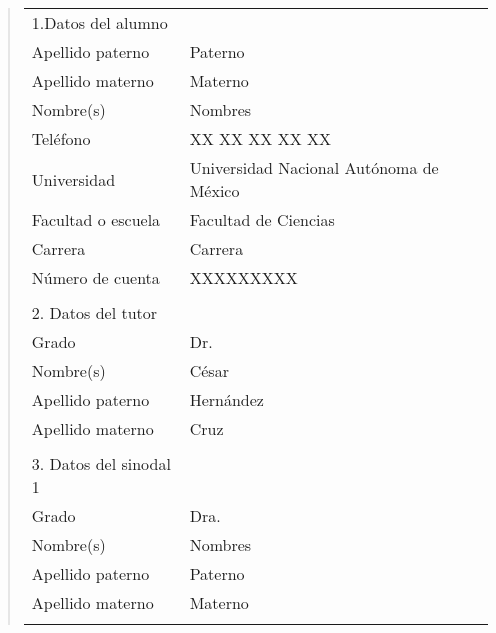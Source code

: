 \begin{quote}
\begin{tabular}{lll}
1.Datos del alumno          & {}                                          \\
Apellido paterno            & Paterno                                     \\
Apellido materno            & Materno                                     \\
Nombre(s)                   & Nombres                                     \\
Tel\'efono                  & XX XX XX XX XX                              \\
Universidad                 & Universidad Nacional Aut\'onoma de M\'exico \\
Facultad o escuela          & Facultad de Ciencias                        \\
Carrera                     & Carrera                                     \\
N\'umero de cuenta          & XXXXXXXXX                                   \\
{}                          & {}                                          \\
2. Datos del tutor          & {}                                          \\
Grado                       & Dr.                                         \\
Nombre(s)                   & C\'esar                                     \\
Apellido paterno            & Hern\'andez                                 \\
Apellido materno            & Cruz                                        \\
{}                          & {}                                          \\
3. Datos del sinodal 1      & {}                                          \\
Grado                       & Dra.                                        \\
Nombre(s)                   & Nombres                                     \\
Apellido paterno            & Paterno                                     \\
Apellido materno            & Materno                                     \\
{}                          & {}                                          \\

\end{tabular}
\end{quote}
